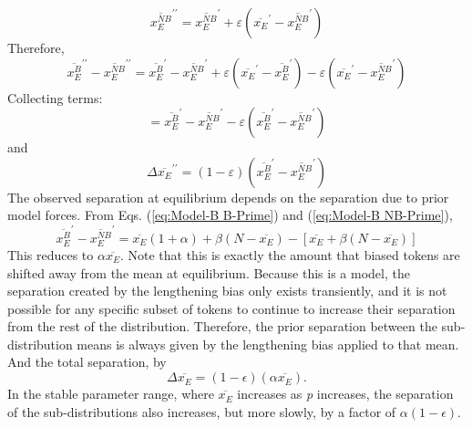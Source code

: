 \begin{equation}
\overline{x_{E}^{NB}}^{\prime\prime}=\overline{x_{E}^{NB}}^{\prime}+\varepsilon\left(\overline{x_{E}}^{\prime}-\overline{x_{E}^{NB}}^{\prime}\right)
\end{equation}
Therefore, 
\begin{equation}
\overline{x_{E}^{B}}^{\prime\prime}-\overline{x_{E}^{NB}}^{\prime\prime}=\overline{x_{E}^{B}}^{\prime}-\overline{x_{E}^{NB}}^{\prime}+\varepsilon\left(\overline{x_{E}}^{\prime}-\overline{x_{E}^{B}}^{\prime}\right)-\varepsilon\left(\overline{x_{E}}^{\prime}-\overline{x_{E}^{NB}}^{\prime}\right)
\end{equation}
Collecting terms:
\begin{equation}
=\overline{x_{E}^{B}}^{\prime}-\overline{x_{E}^{NB}}^{\prime}-\varepsilon\left(\overline{x_{E}^{B}}^{\prime}-\overline{x_{E}^{NB}}^{\prime}\right)
\end{equation}
and
\begin{equation}
\Delta\overline{x_{E}}^{\prime\prime}=(1-\varepsilon)\left(\overline{x_{E}^{B}}^{\prime}-\overline{x_{E}^{NB}}^{\prime}\right)
\end{equation}
The observed separation at equilibrium depends on the separation due
to prior model forces. From Eqs. (\ref{eq:Model-B B-Prime}) and (\ref{eq:Model-B NB-Prime}), 
\begin{equation}
\overline{x_{E}^{B}}^{\prime}-\overline{x_{E}^{NB}}^{\prime}=\overline{x_{E}}(1+\alpha)+\beta(N-\overline{x_{E}})-[\overline{x_{E}}+\beta(N-\overline{x_{E}})]
\end{equation}
This reduces to $\alpha\overline{x_{E}}$. Note that this is exactly
the amount that biased tokens are shifted away from the mean at equilibrium.
Because this is a  model, the separation created by
the lengthening bias only exists transiently, and it is not possible
for any specific subset of tokens to continue to increase their separation
from the rest of the distribution. Therefore, the prior separation
between the sub-distribution means is always given by the lengthening
bias applied to that mean. And the total separation, by 
\begin{equation}
\Delta\overline{x_{E}}=(1-\epsilon)(\alpha\overline{x_{E}}).\label{eq:Cat Sep-1}
\end{equation}
In the stable parameter range, where $\overline{x_{E}}$ increases
as \emph{p} increases, the separation of the sub-distributions also
increases, but more slowly, by a factor of $\alpha(1-\epsilon)$.

